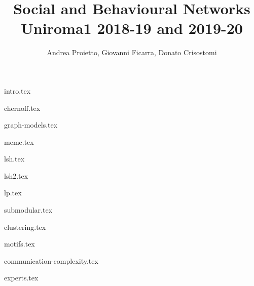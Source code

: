 \documentclass{report}
\title{
    Social and Behavioural Networks \\
    \large Uniroma1 2018-19 and 2019-20
}
\author{Andrea Proietto, Giovanni Ficarra, Donato Crisostomi}
\begin{document}
\maketitle

\tableofcontents


{intro.tex}

{chernoff.tex}

{graph-models.tex}

{meme.tex}
	
{lsh.tex}

{lsh2.tex}

{lp.tex}

{submodular.tex}

{clustering.tex}

{motifs.tex}

{communication-complexity.tex}

{experts.tex}



\end{document}
